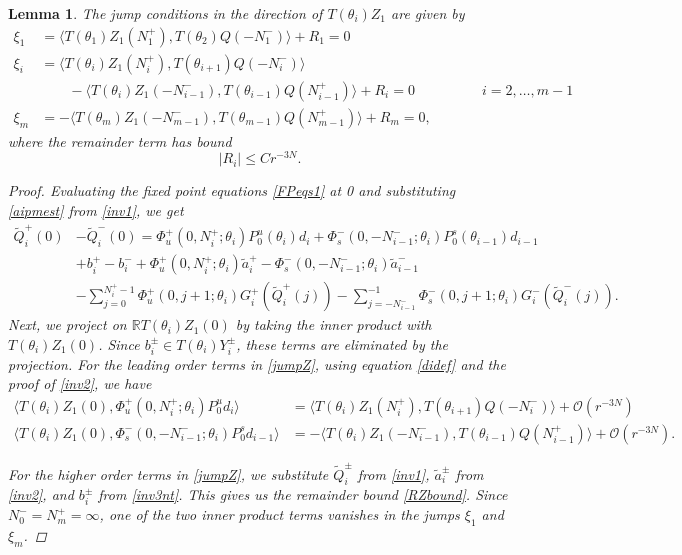 \documentclass[12pt]{elsarticle}
\def\R{{\mathbb R}}
\newtheorem{lemma}{Lemma}
\begin{document}
\begin{lemma}\label{jumpZlemma}
The jump conditions in the direction of $T(\theta_i) Z_1$ are given by
\begin{equation*}
\begin{aligned}
\xi_1 &= \langle T(\theta_1) Z_1(N_1^+), T(\theta_{2}) Q(-N_1^-) \rangle + R_1 = 0 \\
\xi_i &= \langle T(\theta_i) Z_1(N_i^+), T(\theta_{i+1}) Q(-N_i^-) \rangle \\
&\qquad-\langle T(\theta_i) Z_1(-N_{i-1}^-), T(\theta_{i-1}) Q(N_{i-1}^+) \rangle + R_i = 0 && \qquad i = 2, \dots, m-1 \\
\xi_m &= -\langle T(\theta_m) Z_1(-N_{m-1}^-), T(\theta_{m-1}) Q(N_{m-1}^+) \rangle + R_m = 0,
\end{aligned}
\end{equation*}
where the remainder term has bound
\begin{equation}\label{RZbound}
|R_i| \leq C r^{-3N}.
\end{equation}
\begin{proof}
Evaluating the fixed point equations \cref{FPeqs1} at 0 and substituting \cref{aipmest} from \cref{inv1}, we get
\begin{align*}
\tilde{Q}_i^+(0) &- \tilde{Q}_i^-(0) = \Phi_u^+(0, N_i^+; \theta_i) P_0^u(\theta_i) d_i + \Phi_s^-(0, -N_{i-1}^-; \theta_i) P_0^s(\theta_{i-1}) d_{i-1} \\
&+ b_i^+ - b_i^- 
+ \Phi_u^+(0, N_i^+; \theta_i) \tilde{a}_i^+ - \Phi_s^-(0, -N_{i-1}^-; \theta_i) \tilde{a}_{i-1}^- \\
&- \sum_{j = 0}^{N_i^+-1} \Phi_u^+(0, j+1; \theta_i) G_i^+(\tilde{Q}_i^+(j)) 
- \sum_{j = -N_{i-1}^-}^{-1} \Phi_s^-(0, j+1; \theta_i) G_i^-(\tilde{Q}_i^-(j)).
\end{align*}
Next, we project on $\R T(\theta_i) Z_1(0)$ by taking the inner product with $T(\theta_i) Z_1(0)$. Since $b_i^\pm \in T(\theta_i) Y_i^\pm$, these terms are eliminated by the projection. For the leading order terms in \cref{jumpZ}, using equation \cref{didef} and the proof of \cref{inv2}, we have
\begin{align*}
\langle T(\theta_i) Z_1(0), \Phi_u^+(0, N_i^+; \theta_i) P_0^u d_i \rangle
&= \langle T(\theta_i) Z_1(N_i^+), T(\theta_{i+1}) Q(-N_i^-) \rangle + \mathcal{O}(r^{-3N}) \\
\langle T(\theta_i) Z_1(0), \Phi_s^-(0, -N_{i-1}^-; \theta_i) P_0^s d_{i-1} \rangle
&= -\langle T(\theta_i) Z_1(-N_{i-1}^-), T(\theta_{i-1}) Q(N_{i-1}^+) \rangle + \mathcal{O}(r^{-3N}).
\end{align*}

For the higher order terms in \cref{jumpZ}, we substitute $\tilde{Q}_i^\pm$ from \cref{inv1}, $\tilde{a}_i^\pm$ from \cref{inv2}, and $b_i^\pm$ from \cref{inv3nt}. This gives us the remainder bound \cref{RZbound}. Since $N_0^- = N_m^+ = \infty$, one of the two inner product terms vanishes in the jumps $\xi_1$ and $\xi_m$. 
\end{proof}
\end{lemma}
\end{document}
